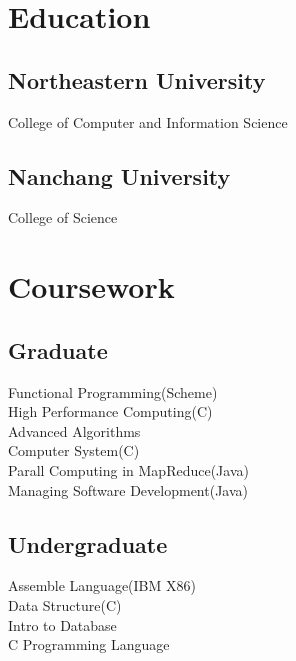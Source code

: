 \documentclass[a4paper]{lyu-resume} %
\begin{document}
\begin{minipage}[t]{0.33\textwidth}



\section{Education} 

\subsection{Northeastern University}

College of Computer and Information Science

\sectionspace %


\subsection{Nanchang University}

College of Science

\sectionspace %


\section{Coursework}

\subsection{Graduate}

Functional Programming(Scheme) \\
High Performance Computing(C)\\
Advanced Algorithms \\
Computer System(C) \\
Parall Computing in MapReduce(Java) \\
Managing Software Development(Java)

\sectionspace %
\subsection{Undergraduate}
Assemble Language(IBM X86) \\
Data Structure(C) \\
Intro to Database \\
C Programming Language

\sectionspace %
\end{minipage} %
\end{document}
